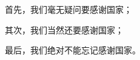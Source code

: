 \documentclass[
    bachelor, 
    pdflinks,
    ]{xjtuthesis}
\begin{document}
    

    \xjtucinfopage
    \xjtueinfopage
    \xjtutoc
    \clearpage

    

    \xjtucontent

        

        

        

        

        

        

    \xjtuendcontent


    \xjtuappendix

        

    \xjtuendappendix


        

        首先，我们毫无疑问要感谢国家；

        其次，我们当然还要感谢国家；

        最后，我们绝对不能忘记感谢国家。
\end{document}
